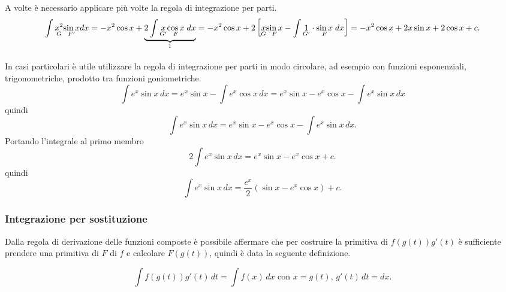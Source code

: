 \begin{example}
    A volte è necessario applicare più volte la regola di integrazione per parti.
    \begin{equation*}
        \int \underset{G}{x^2}\underset{F'}{\sin x}dx=-x^2\cos x+\underbrace{2\int\underset{G'}{x}\underset{F}{\cos x} \; dx}_{\footnotemark}=-x^2\cos x + 2 \left[\underset{G}{x}\underset{F}{\sin x} - \int \underset{G'}{1}\cdot\underset{F}{\sin x} \; dx \right]=-x^2\cos x+ 2x\sin x + 2\cos x + c.
    \end{equation*}
\end{example}

\begin{example}
    In casi particolari è utile utilizzare la regola di integrazione per parti in modo circolare, ad esempio con funzioni esponenziali, trigonometriche, prodotto tra funzioni goniometriche.
    \begin{equation*}
        \int e^x\sin x\, dx= e^x\sin x - \int e^x \cos x\, dx= e^x\sin x - e^x\cos x - \int e^x \sin x\, dx
    \end{equation*}
    quindi
    \begin{equation*}
        \int e^x\sin x\, dx= e^x\sin x - e^x\cos x - \int e^x \sin x\, dx.
    \end{equation*}
    Portando l'integrale al primo membro
    \begin{equation*}
        2\int e^x\sin x\, dx= e^x\sin x - e^x\cos x + c.
    \end{equation*}
    quindi
    \begin{equation*}
        \int e^x\sin x\, dx= \frac{e^x}{2}(\sin x - e^x\cos x) + c.
    \end{equation*}
\end{example}

\subsubsection{Integrazione per sostituzione}
Dalla regola di derivazione delle funzioni composte è possibile affermare che per costruire la primitiva di $f(g(t))g'(t)$ è sufficiente prendere una primitiva di $F$ di $f$ e calcolare $F(g(t))$, quindi è data la seguente definizione.
\begin{definition}
    \begin{equation*}
        \int f(g(t))g'(t)\, dt= \int f(x)\, dx \text{ con } x=g(t),\, g'(t)\, dt=dx.
    \end{equation*}
\end{definition}

